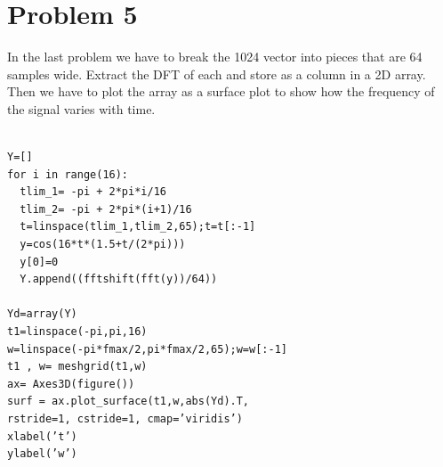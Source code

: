 \documentclass[10pt,english, openany]{book}
\begin{document}
\section{Problem 5}
In the last problem we have to break the 1024 vector into pieces that are 64 samples wide. Extract the DFT of each and store as a column in a 2D array. Then we have to plot the array as a surface plot to show how the frequency of the signal varies with time.\\
\begin{verbatim}

Y=[]
for i in range(16):
  tlim_1= -pi + 2*pi*i/16
  tlim_2= -pi + 2*pi*(i+1)/16 
  t=linspace(tlim_1,tlim_2,65);t=t[:-1] 
  y=cos(16*t*(1.5+t/(2*pi)))
  y[0]=0 
  Y.append((fftshift(fft(y))/64))
  
Yd=array(Y)
t1=linspace(-pi,pi,16) 
w=linspace(-pi*fmax/2,pi*fmax/2,65);w=w[:-1] 
t1 , w= meshgrid(t1,w)
ax= Axes3D(figure())
surf = ax.plot_surface(t1,w,abs(Yd).T, 
rstride=1, cstride=1, cmap=’viridis’) 
xlabel(’t’)
ylabel(’w’)
\end{verbatim}
\end{document}

